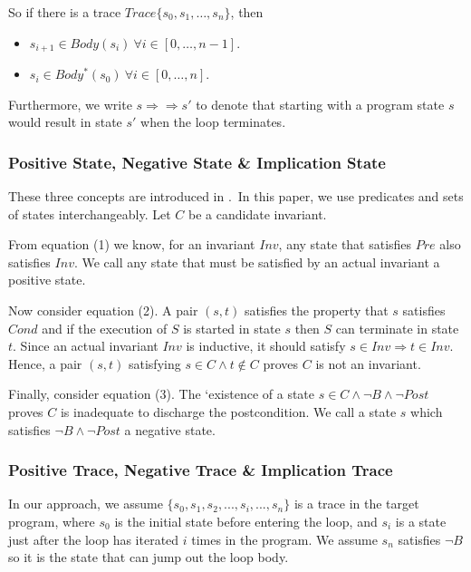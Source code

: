 So if there is a trace $Trace\{ s_0, s_1, \ldots, s_n\}$, then 
\begin{itemize}
\item $s_{i+1} \in Body(s_i)\ \forall i \in [0, \ldots, n-1]$.
\item $s_{i} \in Body^*(s_0)\ \forall i \in [0, \ldots, n]$.
\end{itemize}
Furthermore, we write $s \Rightarrow\Rightarrow s'$ to denote that starting with a program state $s$ would result in state $s'$ when the loop terminates. 


\subsubsection*{Positive State, Negative State \& Implication State}
These three concepts are introduced in \cite{sharma2014invariant}.\
In this paper, we use predicates and sets of states interchangeably.
Let $C$ be a candidate invariant.

From equation (1) we know, for an invariant $Inv$, 
any state that satisfies $Pre$ also satisfies $Inv$. 
We call any state that must be satisfied by an actual invariant a positive state. 


Now consider equation (2).
A pair $(s, t)$ satisfies the property that $s$ satisfies $Cond$ and if the execution of $S$
is started in state $s$ then $S$ can terminate in state $t$. 
Since an actual invariant $Inv$ is inductive, it should satisfy $s \in Inv \Rightarrow t \in {Inv}$. 
Hence, a pair $(s, t)$ satisfying $s \in C \land t \notin C$ proves $C$ is not an invariant. 

Finally, consider equation (3).
The `existence of a state $s \in C \wedge \neg B \wedge \neg Post$ proves $C$ is inadequate to discharge the postcondition. 
We call a state $s$ which satisfies $\neg{B} \land \neg{Post}$ a negative state. 



\subsubsection*{Positive Trace, Negative Trace \& Implication Trace}
In our approach, we assume $\{s_0, s_1, s_2, ..., s_i, ... , s_n\}$ is a trace in the target program,
where $s_0$ is the initial state before entering the loop, 
and $s_i$ is a state just after the loop has iterated $i$ times in the program.
We assume $s_n$ satisfies $\neg B$ so it is the state that can jump out the loop body.



